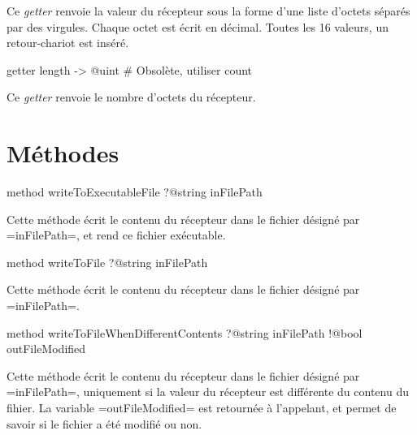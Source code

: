 Ce \emph{getter} renvoie la valeur du récepteur sous la forme d'une liste d'octets séparés par des virgules. Chaque octet est écrit en décimal. Toutes les 16 valeurs, un retour-chariot est inséré.




\begin{galgas3}
getter length -> @uint # Obsolète, utiliser count
\end{galgas3}

Ce \emph{getter} renvoie le nombre d'octets du récepteur.





\section{Méthodes}



\begin{galgas3}
method writeToExecutableFile ?@string inFilePath
\end{galgas3}

Cette méthode écrit le contenu du récepteur dans le fichier désigné par \ggst=inFilePath=, et rend ce fichier exécutable.





\begin{galgas3}
method writeToFile ?@string inFilePath
\end{galgas3}

Cette méthode écrit le contenu du récepteur dans le fichier désigné par \ggst=inFilePath=.





\begin{galgas3}
method writeToFileWhenDifferentContents
  ?@string inFilePath
  !@bool outFileModified
\end{galgas3}

Cette méthode écrit le contenu du récepteur dans le fichier désigné par \ggst=inFilePath=, uniquement si la valeur du récepteur est différente du contenu du fihier. La variable \ggst=outFileModified= est retournée à l'appelant, et permet de savoir si le fichier a été modifié ou non.







